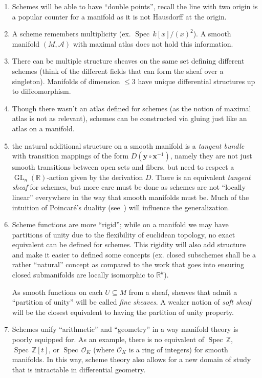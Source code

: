 \documentclass{article}
\newcommand{\R}{{\mathbb{R}}}
\newcommand{\Z}{{\mathbb{Z}}}
\newcommand{\CA}{{\mathcal{A}}}
\newcommand{\CO}{{\mathcal{O}}}
\newcommand{\GL}{{\operatorname{GL}}}
\newcommand{\Spec}{{\operatorname{Spec}\,}}
\newcommand{\sse}{\subseteq}
\begin{document}
\begin{enumerate}
	\item Schemes will be able to have ``double points'', recall the line with two origin is a popular counter
		for a manifold as it is not Hausdorff at the origin.

  \item A scheme remembers multiplicity (ex. $\Spec k[x]/(x)^2$). A smooth manifold $(M, \CA)$ with maximal
    atlas does not hold this information. \item There can be multiple structure sheaves on the same set
    defining different schemes (think of the different fields that can form the sheaf over a singleton).
    Manifolds of dimension $\le 3$ have unique differential structures up to diffeomorphism.

	\item Though there wasn't an atlas defined for schemes (as the notion of maximal atlas is not as
		relevant), schemes can be
		constructed via gluing just like an atlas on a manifold.

  \item the natural additional structure on a smooth manifold is a \emph{tangent bundle} with transition
    mappings of the form $D(\textbf{y}\circ\textbf{x}^{-1})$, namely they are not just smooth transitions
    between open sets and fibers, but need to respect a $\GL_n(\R)$-action given by the derivation $D$. There
    is an equivalent \emph{tangent sheaf} for schemes, but more care must be done as schemes are not ``locally
    linear'' everywhere in the way that smooth manifolds must be. Much of the intuition of Poincar\'e's
    duality (see~\cite[section~4.3]{NateAlgTop}) will influence the generalization.

	\item Scheme functions are more ``rigid''; while on a manifold we may have partitions of unity due to the
		flexibility of euclidean topology, no exact equivalent can be defined for schemes. This rigidity
    will also add structure and make it easier to defined some concepts (ex. closed subschemes shall be a
    rather ``natural'' concept as compared to the work that goes into ensuring closed submanifolds are locally
    isomorphic to $\R^k$).

    As smooth functions on each $U \sse M$ from a sheaf, sheaves that admit a ``partition of unity'' will be
    called \emph{fine sheaves}. A weaker notion of \emph{soft sheaf} will be the closest equivalent to having
    the partition of unity property.


	\item Schemes unify ``arithmetic'' and ``geometry'' in a way manifold theory is poorly equipped for. As an
    example, there is no equivalent of $\Spec \Z$, $\Spec \Z[t]$, or $\Spec \CO_K$ (where $\CO_K$ is a ring
    of integers) for smooth manifolds. In this way, scheme theory also allows for a new domain of study that
		is intractable in differential geometry.


\end{enumerate}
\end{document}
